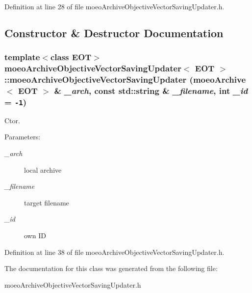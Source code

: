 Definition at line 28 of file moeo\-Archive\-Objective\-Vector\-Saving\-Updater.h.

\subsection{Constructor \& Destructor Documentation}
\subsubsection{\setlength{\rightskip}{0pt plus 5cm}template$<$class EOT$>$ {\bf moeo\-Archive\-Objective\-Vector\-Saving\-Updater}$<$ EOT $>$::{\bf moeo\-Archive\-Objective\-Vector\-Saving\-Updater} ({\bf moeo\-Archive}$<$ EOT $>$ \& {\em \_\-arch}, const std::string \& {\em \_\-filename}, int {\em \_\-id} = {\tt -1})\hspace{0.3cm}{\tt  [inline]}}\label{classmoeoArchiveObjectiveVectorSavingUpdater_cd666b2d6e66cc4c25500f1fdcaa7e76}


Ctor. 

\begin{Desc}
\item[Parameters:]
\begin{description}
\item[{\em \_\-arch}]local archive \item[{\em \_\-filename}]target filename \item[{\em \_\-id}]own ID \end{description}
\end{Desc}


Definition at line 38 of file moeo\-Archive\-Objective\-Vector\-Saving\-Updater.h.

The documentation for this class was generated from the following file:\begin{CompactItemize}
\item 
moeo\-Archive\-Objective\-Vector\-Saving\-Updater.h\end{CompactItemize}
